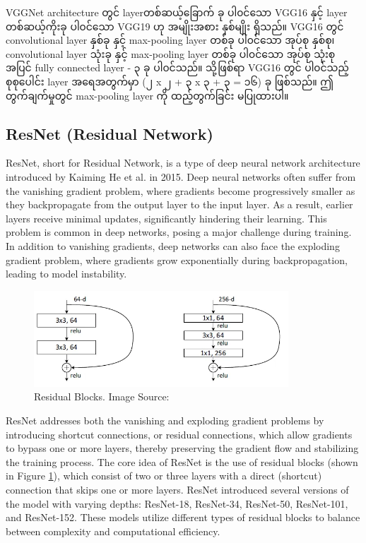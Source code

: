 VGGNet architecture တွင် layerတစ်ဆယ့်ခြောက် ခု ပါ၀င်သော VGG16 နှင့် layer တစ်ဆယ့်ကိုးခု ပါ၀င်သော VGG19 ဟု အမျိုးအစား နှစ်မျိုး ရှိသည်။ VGG16 တွင် convolutional layer နှစ်ခု နှင့် max-pooling layer တစ်ခု ပါ၀င်သော အုပ်စု  နှစ်စု၊ convolutional layer သုံးခု နှင့် max-pooling layer တစ်ခု ပါ၀င်သော အုပ်စု  သုံးစု အပြင် fully connected layer - ၃ ခု  ပါ၀င်သည်။ သို့ဖြစ်ရာ VGG16 တွင် ပါ၀င်သည့် စုစုပေါင်း layer အရေအတွက်မှာ (၂ x ၂  + ၃ x ၃ + ၃ = ၁၆) ခု ဖြစ်သည်။ ဤတွက်ချက်မှုတွင် max-pooling layer ကို ထည့်တွက်ခြင်း မပြုထားပါ။ 

\subsection{ResNet (Residual Network)}
ResNet\cite{ResNet_2016}, short for Residual Network, is a type of deep neural network architecture introduced by Kaiming He et al. in 2015. Deep neural networks often suffer from the vanishing gradient problem, where gradients become progressively smaller as they backpropagate from the output layer to the input layer. As a result, earlier layers receive minimal updates, significantly hindering their learning. This problem is common in deep networks, posing a major challenge during training. In addition to vanishing gradients, deep networks can also face the exploding gradient problem, where gradients grow exponentially during backpropagation, leading to model instability. 

\vspace{0.5em}
\begin{figure}[h]%
\centering 
\includegraphics[width=0.85\textwidth]{imgs/res_block.png}
\caption{Residual Blocks. Image Source: \cite{ResNet_2016}}\label{fig:resnet}
\end{figure}

ResNet addresses both the vanishing and exploding gradient problems by introducing shortcut connections, or residual connections, which allow gradients to bypass one or more layers, thereby preserving the gradient flow and stabilizing the training process. The core idea of ResNet is the use of residual blocks (shown in Figure \ref{fig:resnet}), which consist of two or three layers with a direct (shortcut) connection that skips one or more layers. ResNet introduced several versions of the model with varying depths: ResNet-18, ResNet-34, ResNet-50, ResNet-101, and ResNet-152. These models utilize different types of residual blocks to balance between complexity and computational efficiency.

